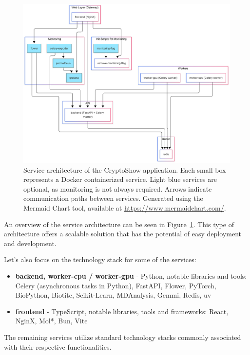 \begin{figure}[htpb]
    \centering
    \includegraphics[width=\textwidth]{img/architecture.png}
    \caption{Service architecture of the CryptoShow application. Each small box represents a Docker containerized service. Light blue services are optional, as monitoring is not always required. Arrows indicate communication paths between services. Generated using the Mermaid Chart tool, available at \url{https://www.mermaidchart.com/}.}
    \label{fig:architecture}
\end{figure}

An overview of the service architecture can be seen in Figure~\ref{fig:architecture}. This type of architecture offers a scalable solution that has the potential of easy deployment and development.

Let's also focus on the technology stack for some of the services:

\begin{itemize}
    \item \textbf{backend, worker-cpu / worker-gpu} - Python, notable libraries and tools: Celery (asynchronous tasks in Python), FastAPI, Flower, PyTorch, BioPython, Biotite, Scikit-Learn, MDAnalysis, Gemmi, Redis, uv
    \item \textbf{frontend} - TypeScript, notable libraries, tools and frameworks: React, NginX, Mol*, Bun, Vite
\end{itemize}

The remaining services utilize standard technology stacks commonly associated with their respective functionalities.

